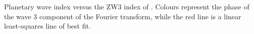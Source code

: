 \label{fig:metric_vs_zw3}
Planetary wave index versus the ZW3 index of \citet{Raphael2004}. Colours represent the phase of the wave 3 component of the Fourier transform, while the red line is a linear least-squares line of best fit.
